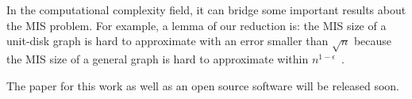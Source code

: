 \documentclass[a4paper]{article}
\newcommand{\<}{\langle}
\renewcommand{\>}{\rangle}
\begin{document}
In the computational complexity field, it can bridge some important results about the MIS problem. For example, a lemma of our reduction is: the MIS size of a unit-disk graph is hard to approximate with an error smaller than $\sqrt{n}$ because the MIS size of a general graph is hard to approximate within $n^{1-\epsilon}$~\cite{Hastad1996}.

The paper for this work as well as an open source software will be released soon.
\end{document}
